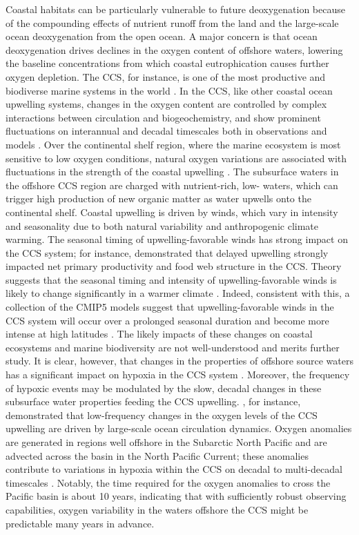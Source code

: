 \documentclass[draft,linenumbers]{report_chapter}
\begin{document}
Coastal habitats can be particularly vulnerable to future deoxygenation because of the compounding effects of nutrient runoff from the land and the large-scale ocean deoxygenation from the open ocean.
A major concern is that ocean deoxygenation drives declines in the oxygen content of offshore waters, lowering the baseline concentrations from which coastal eutrophication causes further oxygen depletion.
The CCS, for instance, is one of the most productive and biodiverse marine systems in the world \citep{Block-Jonsen-etal-2011,Carr-2001}.
In the CCS, like other coastal ocean upwelling systems, changes in the oxygen content are controlled by complex interactions between circulation and biogeochemistry, and show prominent fluctuations on interannual and decadal timescales both in observations and models \citep[section~\ref{loc:toe};][]{Bograd-Castro-etal-2008,Deutsch-Brix-etal-2011}.
Over the continental shelf region, where the marine ecosystem is most sensitive to low oxygen conditions, natural oxygen variations are associated with fluctuations in the strength of the coastal upwelling \citep{Connolly-Hickey-etal-2010,Chan-Barth-etal-2008}.
The subsurface waters in the offshore CCS region are charged with nutrient-rich, low- waters, which can trigger high production of new organic matter as water upwells onto the continental shelf.
Coastal upwelling is driven by winds, which vary in intensity and seasonality due to both natural variability and anthropogenic climate warming.
The seasonal timing of upwelling-favorable winds has strong impact on the CCS system; for instance, \citet{Barth-Menge-etal-2007} demonstrated that delayed upwelling strongly impacted net primary productivity and food web structure in the CCS.
Theory suggests that the seasonal timing and intensity of upwelling-favorable winds is likely to change significantly in a warmer climate \citep{Bakun-1990}.
Indeed, consistent with this, a collection of the CMIP5 models suggest that upwelling-favorable winds in the CCS system will occur over a prolonged seasonal duration and become more intense at high latitudes \citep{Wang-Gouhier-etal-2015}.
The likely impacts of these changes on coastal ecosystems and marine biodiversity are not well-understood and merits further study.
It is clear, however, that changes in the properties of offshore source waters has a significant impact on hypoxia in the CCS system \citep{Grantham-Chan-etal-2004,Bograd-Castro-etal-2008}.
Moreover, the frequency of hypoxic events may be modulated by the slow, decadal changes in these subsurface water properties feeding the CCS upwelling.
\citet{Pozo-Buil-Di-Lorenzo-2017}, for instance, demonstrated that low-frequency changes in the oxygen levels of the CCS upwelling are driven by large-scale ocean circulation dynamics.
Oxygen anomalies are generated in regions well offshore in the Subarctic North Pacific and are advected across the basin in the North Pacific Current; these anomalies contribute to variations in hypoxia within the CCS on decadal to multi-decadal timescales \citep{Pozo-Buil-Di-Lorenzo-2017}.
Notably, the time required for the oxygen anomalies to cross the Pacific basin is about 10 years, indicating that with sufficiently robust observing capabilities, oxygen variability in the waters offshore the CCS might be predictable many years in advance.
\end{document}
